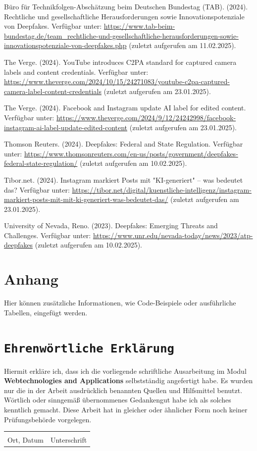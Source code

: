 \documentclass[a4paper,12pt]{article}
\begin{document}
\begin{thebibliography}{99}
 Büro für Technikfolgen-Abschätzung beim Deutschen Bundestag (TAB). (2024). Rechtliche und gesellschaftliche Herausforderungen sowie Innovationspotenziale von Deepfakes.
Verfügbar unter: \url{https://www.tab-beim-bundestag.de/team_rechtliche-und-gesellschaftliche-herausforderungen-sowie-innovationspotenziale-von-deepfakes.php} (zuletzt aufgerufen am 11.02.2025).

 The Verge. (2024). YouTube introduces C2PA standard for captured camera labels and content credentials. 
Verfügbar unter: \url{https://www.theverge.com/2024/10/15/24271083/youtube-c2pa-captured-camera-label-content-credentials} (zuletzt aufgerufen am 23.01.2025).

 The Verge. (2024). Facebook and Instagram update AI label for edited content. 
Verfügbar unter: \url{https://www.theverge.com/2024/9/12/24242998/facebook-instagram-ai-label-update-edited-content} (zuletzt aufgerufen am 23.01.2025).

 Thomson Reuters. (2024). Deepfakes: Federal and State Regulation.  
Verfügbar unter: \url{https://www.thomsonreuters.com/en-us/posts/government/deepfakes-federal-state-regulation/} (zuletzt aufgerufen am 10.02.2025).

 Tibor.net. (2024). Instagram markiert Posts mit "KI-generiert" – was bedeutet das? 
Verfügbar unter: \url{https://tibor.net/digital/kuenstliche-intelligenz/instagram-markiert-posts-mit-mit-ki-generiert-was-bedeutet-das/} (zuletzt aufgerufen am 23.01.2025).

 University of Nevada, Reno. (2023). Deepfakes: Emerging Threats and Challenges.
Verfügbar unter: \url{https://www.unr.edu/nevada-today/news/2023/atp-deepfakes} (zuletzt aufgerufen am 10.02.2025).
\end{thebibliography}
\newpage
\appendix
\section{Anhang}
Hier können zusätzliche Informationen, wie Code-Beispiele oder ausführliche Tabellen, eingefügt werden.

\newpage
{}
\section*{\texttt{Ehrenwörtliche Erklärung}}
Hiermit erkläre ich, dass ich die vorliegende schriftliche Ausarbeitung im Modul \textbf{Webtechnologies and Applications} selbstständig
angefertigt habe. Es wurden nur die in der Arbeit ausdrücklich benannten Quellen und
Hilfsmittel benutzt. Wörtlich oder sinngemäß übernommenes Gedankengut habe ich als
solches kenntlich gemacht. Diese Arbeit hat in gleicher oder ähnlicher Form noch keiner
Prüfungsbehörde vorgelegen.

\vspace{3cm}
\noindent\begin{tabular}{p{}p{}}
    \hrulefill & \hrulefill \\
    Ort, Datum & Unterschrift \\
\end{tabular}
\end{document}
